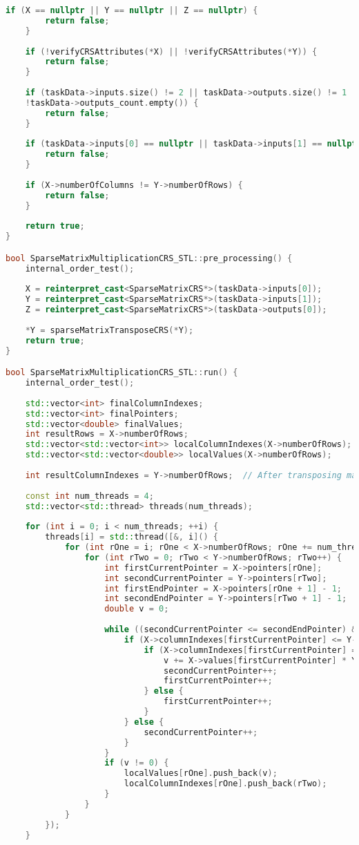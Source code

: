 \documentclass[a4paper, 14pt]{article}
\theoremstyle{plain}
\begin{document}
\begin{lstlisting}[language=C++,caption=Файл sparse\_matmult\_crs\_stl.cpp]
	if (X == nullptr || Y == nullptr || Z == nullptr) {
		return false;
	}
	
	if (!verifyCRSAttributes(*X) || !verifyCRSAttributes(*Y)) {
		return false;
	}
	
	if (taskData->inputs.size() != 2 || taskData->outputs.size() != 1 || !taskData->inputs_count.empty() ||
	!taskData->outputs_count.empty()) {
		return false;
	}
	
	if (taskData->inputs[0] == nullptr || taskData->inputs[1] == nullptr || taskData->outputs[0] == nullptr) {
		return false;
	}
	
	if (X->numberOfColumns != Y->numberOfRows) {
		return false;
	}
	
	return true;
}

bool SparseMatrixMultiplicationCRS_STL::pre_processing() {
	internal_order_test();
	
	X = reinterpret_cast<SparseMatrixCRS*>(taskData->inputs[0]);
	Y = reinterpret_cast<SparseMatrixCRS*>(taskData->inputs[1]);
	Z = reinterpret_cast<SparseMatrixCRS*>(taskData->outputs[0]);
	
	*Y = sparseMatrixTransposeCRS(*Y);
	return true;
}

bool SparseMatrixMultiplicationCRS_STL::run() {
	internal_order_test();
	
	std::vector<int> finalColumnIndexes;
	std::vector<int> finalPointers;
	std::vector<double> finalValues;
	int resultRows = X->numberOfRows;
	std::vector<std::vector<int>> localColumnIndexes(X->numberOfRows);
	std::vector<std::vector<double>> localValues(X->numberOfRows);
	
	int resultColumnIndexes = Y->numberOfRows;  // After transposing matrix Y
	
	const int num_threads = 4;
	std::vector<std::thread> threads(num_threads);
	
	for (int i = 0; i < num_threads; ++i) {
		threads[i] = std::thread([&, i]() {
			for (int rOne = i; rOne < X->numberOfRows; rOne += num_threads) {
				for (int rTwo = 0; rTwo < Y->numberOfRows; rTwo++) {
					int firstCurrentPointer = X->pointers[rOne];
					int secondCurrentPointer = Y->pointers[rTwo];
					int firstEndPointer = X->pointers[rOne + 1] - 1;
					int secondEndPointer = Y->pointers[rTwo + 1] - 1;
					double v = 0;
					
					while ((secondCurrentPointer <= secondEndPointer) && (firstCurrentPointer <= firstEndPointer)) {
						if (X->columnIndexes[firstCurrentPointer] <= Y->columnIndexes[secondCurrentPointer]) {
							if (X->columnIndexes[firstCurrentPointer] == Y->columnIndexes[secondCurrentPointer]) {
								v += X->values[firstCurrentPointer] * Y->values[secondCurrentPointer];
								secondCurrentPointer++;
								firstCurrentPointer++;
							} else {
								firstCurrentPointer++;
							}
						} else {
							secondCurrentPointer++;
						}
					}
					if (v != 0) {
						localValues[rOne].push_back(v);
						localColumnIndexes[rOne].push_back(rTwo);
					}
				}
			}
		});
	}
	

\end{lstlisting}
\end{document}
